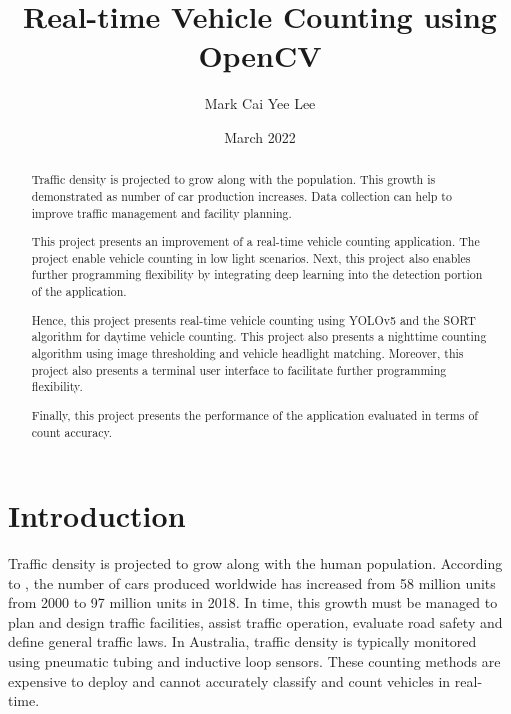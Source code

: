 \documentclass[12pt,a4paper,fleqn]{report}
\title{Real-time Vehicle Counting using OpenCV}
\author{Mark Cai Yee Lee}
\date{March 2022}
\begin{document}
\maketitle

\begin{abstract}
Traffic density is projected to grow along with the population. 
This growth is demonstrated as number of car production increases.
Data collection can help to improve traffic management and facility planning.

This project presents an improvement of a real-time vehicle counting application.
The project enable vehicle counting in low light scenarios. 
Next, this project also enables further programming flexibility by integrating deep learning into
the detection portion of the application.

Hence, this project presents real-time vehicle counting using YOLOv5 and the SORT algorithm for
daytime vehicle counting.
This project also presents a nighttime counting algorithm using image thresholding and vehicle 
headlight matching. 
Moreover, this project also presents a terminal user interface to facilitate further programming
flexibility.

Finally, this project presents the performance of the application evaluated in terms of count accuracy. 

\end{abstract}

\tableofcontents
\listoffigures
\begingroup
\let\clearpage\relax
\listoftables
\listoflistings
\endgroup

\chapter{Introduction}

Traffic density is projected to grow along with the human population. 
According to \cite{placek:2022}, the number of cars produced worldwide has increased from 58 million
units from 2000 to 97 million units in 2018.
In time, this growth must be managed to plan and design traffic facilities, assist traffic
operation, evaluate road safety and define general traffic laws.
In Australia, traffic density is typically monitored using pneumatic tubing and inductive loop
sensors. 
These counting methods are expensive to deploy and cannot accurately classify and count vehicles in
real-time.
\end{document}

